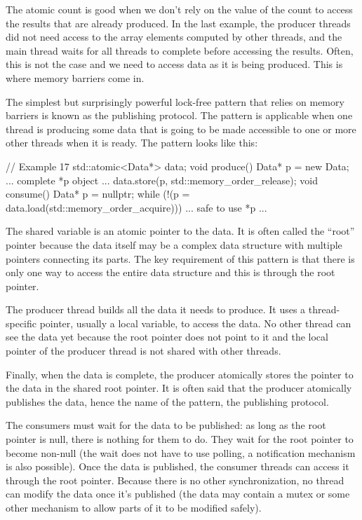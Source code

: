The atomic count is good when we don't rely on the value of the count to access the results that are already produced. In the last example, the producer threads did not need access to the array elements computed by other threads, and the main thread waits for all threads to complete before accessing the results. Often, this is not the case and we need to access data as it is being produced. This is where memory barriers come in.

The simplest but surprisingly powerful lock-free pattern that relies on memory barriers is known as the publishing protocol. The pattern is applicable when one thread is producing some data that is going to be made accessible to one or more other threads when it is ready. The pattern looks like this:

\begin{code}
// Example 17
std::atomic<Data*> data;
void produce() {
  Data* p = new Data;
  ... complete *p object ...
  data.store(p, std::memory_order_release);
}
void consume() {
  Data* p = nullptr;
  while (!(p = data.load(std::memory_order_acquire))) {}
  ... safe to use *p ...
}
\end{code}

The shared variable is an atomic pointer to the data. It is often called the ``root'' pointer because the data itself may be a complex data structure with multiple pointers connecting its parts. The key requirement of this pattern is that there is only one way to access the entire data structure and this is through the root pointer.

The producer thread builds all the data it needs to produce. It uses a thread-specific pointer, usually a local variable, to access the data. No other thread can see the data yet because the root pointer does not point to it and the local pointer of the producer thread is not shared with other threads.

Finally, when the data is complete, the producer atomically stores the pointer to the data in the shared root pointer. It is often said that the producer atomically publishes the data, hence the name of the pattern, the publishing protocol.

The consumers must wait for the data to be published: as long as the root pointer is null, there is nothing for them to do. They wait for the root pointer to become non-null (the wait does not have to use polling, a notification mechanism is also possible). Once the data is published, the consumer threads can access it through the root pointer. Because there is no other synchronization, no thread can modify the data once it's published (the data may contain a mutex or some other mechanism to allow parts of it to be modified safely).


